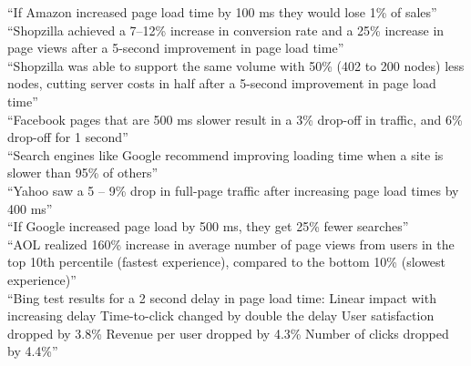 	“If Amazon increased page load time by 100 ms they would lose 1\% of sales”\\

	“Shopzilla achieved a 7–12\% increase in conversion rate and a 25\% increase in page views after a 5-second improvement in page load time”\\

	“Shopzilla was able to support the same volume with 50\% (402 to 200 nodes) less nodes, cutting server costs in half after a 5-second improvement in page load time”\\

	“Facebook pages that are 500 ms slower result in a 3\% drop-off in traffic, and 6\% drop-off for 1 second”\\

	“Search engines like Google recommend improving loading time when a site is slower than 95\% of others”\\

	“Yahoo saw a 5 – 9\% drop in full-page traffic after increasing page load times by 400 ms”\\

	“If Google increased page load by 500 ms, they get 25\% fewer searches”\\

	“AOL realized 160\% increase in average number of page views from users in the top 10th percentile (fastest experience), compared to the bottom 10\% (slowest experience)”\\

	“Bing test results for a 2 second delay in page load time:
	Linear impact with increasing delay
	Time-to-click changed by double the delay
	User satisfaction dropped by 3.8\%
	Revenue per user dropped by 4.3\%
	Number of clicks dropped by 4.4\%”\\

	

